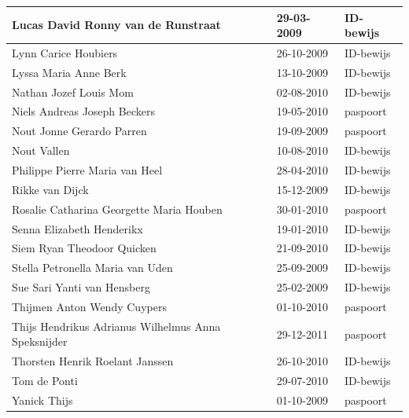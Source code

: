 \documentclass[11pt,a4paper]{letter}
\begin{document}
\begin{tabular}{|l|l|l|}
Lucas David Ronny van de Runstraat & 29-03-2009 & ID-bewijs \\ \hline
Lynn Carice Houbiers & 26-10-2009 & ID-bewijs \\ \hline
Lyssa Maria Anne Berk & 13-10-2009 & ID-bewijs \\ \hline
Nathan Jozef Louis Mom & 02-08-2010 & ID-bewijs \\ \hline
Niels Andreas Joseph Beckers & 19-05-2010 & paspoort \\ \hline
Nout Jonne Gerardo Parren & 19-09-2009 & paspoort \\ \hline
Nout Vallen & 10-08-2010 & ID-bewijs \\ \hline
Philippe Pierre Maria van Heel & 28-04-2010 & ID-bewijs \\ \hline
Rikke van Dijck & 15-12-2009 & ID-bewijs \\ \hline
Rosalie Catharina Georgette Maria Houben & 30-01-2010 & paspoort \\ \hline
Senna Elizabeth Henderikx & 19-01-2010 & ID-bewijs \\ \hline
Siem Ryan Theodoor Quicken & 21-09-2010 & ID-bewijs \\ \hline
Stella Petronella Maria van Uden & 25-09-2009 & ID-bewijs \\ \hline
Sue Sari Yanti van Hensberg & 25-02-2009 & ID-bewijs \\ \hline
Thijmen Anton Wendy Cuypers & 01-10-2010 & paspoort \\ \hline
Thijs Hendrikus Adrianus Wilhelmus Anna Speksnijder & 29-12-2011 & paspoort \\ \hline
Thorsten Henrik Roelant Janssen & 26-10-2010 & ID-bewijs \\ \hline
Tom de Ponti & 29-07-2010 & ID-bewijs \\ \hline
Yanick Thijs & 01-10-2009 & paspoort \\ \hline
\end{tabular}
\end{document}

